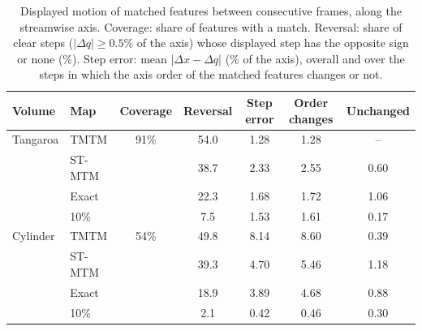 \begin{table}[!htb]
\centering
\caption{Displayed motion of matched features between consecutive frames, along the streamwise axis. Coverage: share of features with a match. Reversal: share of clear steps ($|\Delta q|\ge0.5\%$ of the axis) whose displayed step has the opposite sign or none (\%). Step error: mean $|\Delta x-\Delta q|$ (\% of the axis), overall and over the steps in which the axis order of the matched features changes or not.}
\label{tab:motion}
\footnotesize
\setlength{\tabcolsep}{3pt}
\begin{tabular}{@{}llccccc@{}}
\toprule
Volume & Map & Coverage & Reversal & Step error & Order changes & Unchanged \\
\midrule
Tangaroa & TMTM & 91\% & 54.0 & 1.28 & 1.28 & -- \\
 & ST-MTM &  & 38.7 & 2.33 & 2.55 & 0.60 \\
 & Exact &  & 22.3 & 1.68 & 1.72 & 1.06 \\
 & 10\% &  & 7.5 & 1.53 & 1.61 & 0.17 \\
Cylinder & TMTM & 54\% & 49.8 & 8.14 & 8.60 & 0.39 \\
 & ST-MTM &  & 39.3 & 4.70 & 5.46 & 1.18 \\
 & Exact &  & 18.9 & 3.89 & 4.68 & 0.88 \\
 & 10\% &  & 2.1 & 0.42 & 0.46 & 0.30 \\
\bottomrule
\end{tabular}
\end{table}
